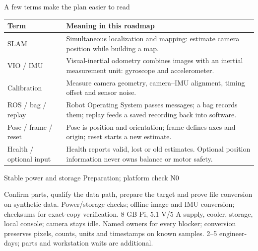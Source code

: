 \begin{frame}{A few terms make the plan easier to read}
\small\renewcommand{\arraystretch}{1.18}
\begin{tabular}{@{}L{42mm}L{142mm}@{}}\toprule
\textbf{Term} & \textbf{Meaning in this roadmap}\\\midrule
SLAM & Simultaneous localization and mapping: estimate camera position while building a map.\\
VIO / IMU & Visual-inertial odometry combines images with an inertial measurement unit: gyroscope and accelerometer.\\
Calibration & Measure camera geometry, camera--IMU alignment, timing offset and sensor noise.\\
ROS / bag / replay & Robot Operating System passes messages; a bag records them; replay feeds a saved recording back into software.\\
Pose / frame / reset & Pose is position and orientation; frame defines axes and origin; reset starts a new estimate.\\
Health / optional input & Health reports valid, lost or old estimates. Optional position information never owns balance or motor safety.\\\bottomrule\end{tabular}
\end{frame}

\begin{frame}{Stable power and storage}
\relax
{\small\color{muted}Preparation; platform check N0}\par\medskip
{}
{Confirm parts, qualify the data path, prepare the target and prove file conversion on synthetic data.}
{Power/storage checks; offline image and IMU conversion; checksums for exact-copy verification.}
{8 GB Pi, 5.1 V/5 A supply, cooler, storage, local console; camera stays idle.}
{Named owners for every blocker; conversion preserves pixels, counts, units and timestamps on known samples.}
{2--5 engineer-days; parts and workstation waits are additional.}
\end{frame}

